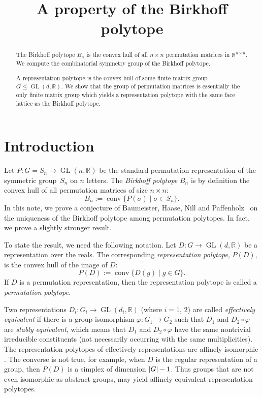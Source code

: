 \documentclass[ALCO,Unicode]{cedram}
\title{A property of the Birkhoff polytope}
\author{\firstname{Barbara} \lastname{Baumeister}}
\author{\firstname{Frieder} \lastname{Ladisch}}
\renewcommand{\phi}{\varphi}
\renewcommand{\leq}{\leqslant}
\newcommand{\reals}{\mathbb{R}}
\DeclarePairedDelimiter{\card}{\lvert}{\rvert}  %
\DeclareMathOperator{\GL}{GL}
\DeclareMathOperator{\conv}{conv}
\begin{document}
\begin{abstract}
  The Birkhoff polytope $B_n$ is the convex hull
  of all $n\times n$ permutation matrices in
  $\mathbb{R}^{n\times n}$.  
  We compute the combinatorial symmetry group 
  of the Birkhoff polytope.
  
  A representation polytope is 
  the convex hull of some finite matrix group
  $G\leq \operatorname{GL}(d,\mathbb{R})$.
  We show that the group of permutation matrices
  is essentially the only finite matrix group
  which yields a representation polytope 
  with the same face lattice as the Birkhoff polytope.  
\end{abstract}

\maketitle

\section{Introduction}
Let $P\colon G= S_n \to \GL(n,\reals)$ be the 
standard permutation representation of 
the symmetric group~$S_n$ on $n$ letters.
The \emph{Birkhoff polytope} $B_n$ is by definition
the convex hull of all permutation matrices of size $n\times n$:
\[ B_n := \conv\{ P(\sigma) \mid \sigma\in S_n\}.
\]
In this note, we prove a conjecture of
Baumeister, Haase, Nill and Paffenholz~\cite[Conjecture~5.3]{BHNP09}
on the uniqueness of the Birkhoff polytope among
permutation polytopes.
In fact, we prove a slightly stronger result.

To state the result, we need the following notation.
Let $D\colon G\to \GL(d,\reals)$
be a representation over the reals.
The corresponding \emph{representation polytope},
$P(D)$, is the convex hull of the image of $D$:
\[ P(D):= \conv\{ D(g) \mid g\in G
               \}.
\]
If $D$ is a permutation representation, then the 
representation polytope is called a 
\emph{permutation polytope}.

Two representations 
$D_i\colon G_i \to \GL(d_i,\reals)$
(where $i=1$, $2$) are called 
\emph{effectively equivalent} if there is 
a group isomorphism $\phi\colon G_1\to G_2$
such that $D_1$ and $D_2\circ \phi$ are 
\emph{stably equivalent},
which means that $D_1$ and $D_2\circ \phi$ 
have the same nontrivial irreducible constituents 
(not necessarily occurring with the same multiplicities).
The representation polytopes of effectively representations are
affinely isomorphic
\cite[Theorem~2.4]{BaumeisterGrueninger15} \cite[\S~2]{BHNP09}.
The converse is not true, for example, 
when $D$ is the regular representation of a group,
then $P(D)$ is a simplex of dimension $\card{G}-1$.
Thus groups that are not even isomorphic as abstract groups,
may yield affinely equivalent representation polytopes.
\end{document}
